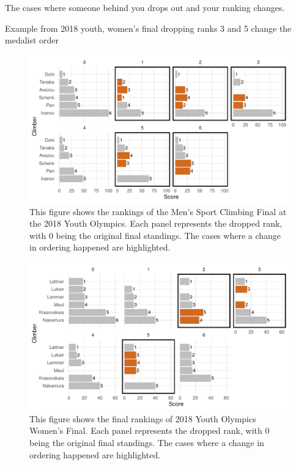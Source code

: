 \documentclass[12pt]{article}
\begin{document}
The cases where someone behind you drops out and your ranking changes.

Example from 2018 youth, women's final dropping ranks 3 and 5 change the
medalist order

\begin{figure}[H]
\centering
\includegraphics{draft_files/figure-latex/unnamed-chunk-12-1.pdf}
\caption{This figure shows the rankings of the Men's Sport Climbing
Final at the 2018 Youth Olympics. Each panel represents the dropped
rank, with 0 being the original final standings. The cases where a
change in ordering happened are highlighted.}
\end{figure}

\begin{figure}[H]
\centering
\includegraphics{draft_files/figure-latex/unnamed-chunk-13-1.pdf}
\caption{This figure shows the final rankings of 2018 Youth Olympics
Women's Final. Each panel represents the dropped rank, with 0 being the
original final standings. The cases where a change in ordering happened
are highlighted.}
\end{figure}



\end{document}
